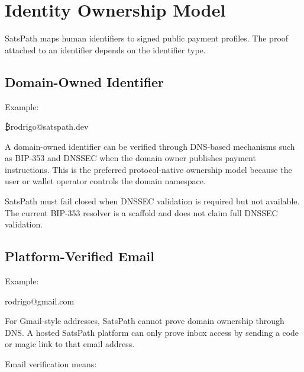 \documentclass[
]{article}
\author{}
\date{}
\newenvironment{Shaded}{}{}
\newcommand{\NormalTok}[1]{#1}
\begin{document}
\hypertarget{identity-ownership-model}{%
\section{Identity Ownership Model}\label{identity-ownership-model}}

SatsPath maps human identifiers to signed public payment profiles. The
proof attached to an identifier depends on the identifier type.

\hypertarget{domain-owned-identifier}{%
\subsection{Domain-Owned Identifier}\label{domain-owned-identifier}}

Example:

\begin{Shaded}
\begin{Highlighting}[]
\NormalTok{₿rodrigo@satspath.dev}
\end{Highlighting}
\end{Shaded}

A domain-owned identifier can be verified through DNS-based mechanisms
such as BIP-353 and DNSSEC when the domain owner publishes payment
instructions. This is the preferred protocol-native ownership model
because the user or wallet operator controls the domain namespace.

SatsPath must fail closed when DNSSEC validation is required but not
available. The current BIP-353 resolver is a scaffold and does not claim
full DNSSEC validation.

\hypertarget{platform-verified-email}{%
\subsection{Platform-Verified Email}\label{platform-verified-email}}

Example:

\begin{Shaded}
\begin{Highlighting}[]
\NormalTok{rodrigo@gmail.com}
\end{Highlighting}
\end{Shaded}

For Gmail-style addresses, SatsPath cannot prove domain ownership
through DNS. A hosted SatsPath platform can only prove inbox access by
sending a code or magic link to that email address.

Email verification means:
\end{document}
